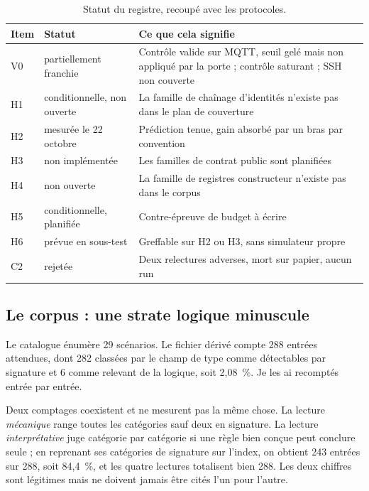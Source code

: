 \begin{table}[H]
\centering
\caption{Statut du registre, recoupé avec les protocoles.}
\label{tab:registre}
\small
\begin{tabular}{@{}p{1.1cm}p{3.4cm}p{8.2cm}@{}}
\toprule
Item & Statut & Ce que cela signifie \\
\midrule
V0 & partiellement franchie & Contrôle valide sur MQTT, seuil gelé mais non appliqué par la porte ; contrôle saturant ; SSH non couverte \\
H1 & conditionnelle, non ouverte & La famille de chaînage d'identités n'existe pas dans le plan de couverture \\
H2 & mesurée le 22 octobre & Prédiction tenue, gain absorbé par un bras par convention \\
H3 & non implémentée & Les familles de contrat public sont planifiées \\
H4 & non ouverte & La famille de registres constructeur n'existe pas dans le corpus \\
H5 & conditionnelle, planifiée & Contre-épreuve de budget à écrire \\
H6 & prévue en sous-test & Greffable sur H2 ou H3, sans simulateur propre \\
C2 & rejetée & Deux relectures adverses, mort sur papier, aucun run \\
\bottomrule
\end{tabular}
\end{table}

\subsection{Le corpus : une strate logique minuscule}

Le catalogue énumère 29 scénarios. Le fichier dérivé
 compte 288 entrées attendues, dont
282 classées par le champ de type comme détectables par signature et 6 comme
relevant de la logique, soit 2,08~\%. Je les ai recomptés entrée par entrée.

Deux comptages coexistent et ne mesurent pas la même chose. La lecture
\emph{mécanique} range toutes les catégories sauf deux en signature. La lecture
\emph{interprétative} juge catégorie par catégorie si une règle bien conçue peut
conclure seule ; en reprenant ses catégories de signature sur l'index, on obtient
243 entrées sur 288, soit 84,4~\%, et les quatre lectures totalisent bien 288.
Les deux chiffres sont légitimes mais ne doivent jamais être cités l'un pour
l'autre.

